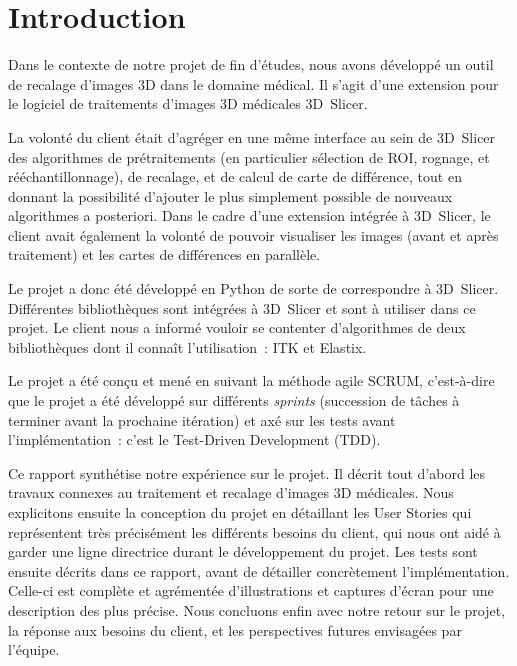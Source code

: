\documentclass{article}
\begin{document}
{
    \section{Introduction}
    \label{sec:introduction}

    Dans le contexte de notre projet de fin d'études, nous avons développé un outil de recalage d'images 3D dans le domaine médical. Il s'agit d'une extension pour le logiciel de traitements d'images 3D médicales 3D~Slicer.

    \bigskip

    La volonté du client était d'agréger en une même interface au sein de 3D~Slicer des algorithmes de prétraitements (en particulier sélection de ROI, rognage, et rééchantillonnage), de recalage, et de calcul de carte de différence, tout en donnant la possibilité d'ajouter le plus simplement possible de nouveaux algorithmes a posteriori. Dans le cadre d'une extension intégrée à 3D~Slicer, le client avait également la volonté de pouvoir visualiser les images (avant et après traitement) et les cartes de différences en parallèle.

    \bigskip

    Le projet a donc été développé en Python de sorte de correspondre à 3D~Slicer. Différentes bibliothèques sont intégrées à 3D~Slicer et sont à utiliser dans ce projet. Le client nous a informé vouloir se contenter d'algorithmes de deux bibliothèques dont il connaît l'utilisation~: ITK et Elastix.

    \bigskip

    Le projet a été conçu et mené en suivant la méthode agile SCRUM, c'est-à-dire que le projet a été développé sur différents \textit{sprints} (succession de tâches à terminer avant la prochaine itération) et axé sur les tests avant l'implémentation~: c'est le Test-Driven Development (TDD).

    \bigskip

    Ce rapport synthétise notre expérience sur le projet. Il décrit tout d'abord les travaux connexes au traitement et recalage d'images 3D médicales. Nous explicitons ensuite la conception du projet en détaillant les User Stories qui représentent très précisément les différents besoins du client, qui nous ont aidé à garder une ligne directrice durant le développement du projet. Les tests sont ensuite décrits dans ce rapport, avant de détailler concrètement l'implémentation. Celle-ci est complète et agrémentée d'illustrations et captures d'écran pour une description des plus précise. Nous concluons enfin avec notre retour sur le projet, la réponse aux besoins du client, et les perspectives futures envisagées par l'équipe.

}
\end{document}
